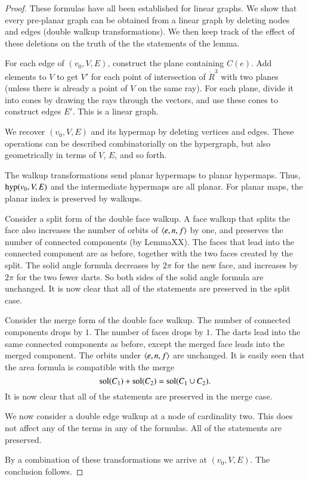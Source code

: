 \begin{proof}  These formulas have all been established for linear
graphs.  We show that every pre-planar graph can be obtained from a
linear graph by deleting nodes and edges (double walkup
transformations).  We then keep track of the effect of these
deletions on the truth of the the statements of the lemma.

For each edge of $(v_0,V,E)$, construct the plane containing $C(e)$. Add
elements to $V$ to get $V'$ for each point of intersection of $\ring{R}^3$
with two planes (unless there is already a point of $V$ on the same
ray). For each plane, divide it into cones by drawing the rays
through the vectors, and use these cones to construct edges $E'$.
This is a linear graph.

We recover $(v_0,V,E)$ and its hypermap by deleting vertices and edges.
These operations can be described combinatorially on the hypergraph,
but also geometrically in terms of $V$, $E$, and so forth.

The walkup transformations send planar hypermaps to planar
hypermaps.  Thus, ${\operatorname{hyp}}(v_0,V,E)$ and the intermediate hypermaps
are all planar.  For planar maps, the planar index is preserved by
walkups.

Consider a split form of the double face walkup.  A face walkup that
splits the face also increases the number of orbits of
$\langle e,n,f\rangle$ by one, and preserves the number of connected
components (by LemmaXX).  The faces that lead into the connected
component are as before, together with the two faces created by the
split.  The solid angle formula decreases by $2\pi$ for the new
face, and increases by $2\pi$ for the two fewer darts.  So both
sides of the solid angle formula are unchanged.  It is now clear
that all of the statements are preserved in the split case.

Consider the merge form of the double face walkup.  The number of
connected components drops by $1$.  The number of faces drops by
$1$.  The darts lead into the same connected components as before,
except the merged face leads into the merged component.  The orbits
under $\langle e,n,f\rangle$ are unchanged.  It is easily seen that the
area formula is compatible with the merge $${\operatorname{sol}}(C_1) +
{\operatorname{sol}}(C_2) = {\operatorname{sol}}(C_1\cup C_2).$$ It is now clear that all of
the statements are preserved in the merge case.

We now consider a double edge walkup at a node of cardinality two.
This does not affect any of the terms in any of the formulas.  All
of the statements are preserved.

By a combination of these transformations we arrive at $(v_0,V,E)$.  The
conclusion follows.
\end{proof}


